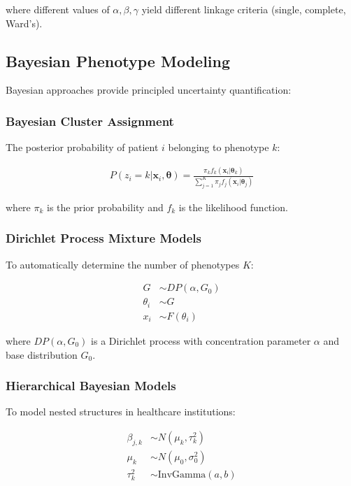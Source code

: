 \documentclass[12pt]{article}
\begin{document}
where different values of $\alpha, \beta, \gamma$ yield different linkage criteria (single, complete, Ward's).

\subsection{Bayesian Phenotype Modeling}

Bayesian approaches provide principled uncertainty quantification:

\subsubsection{Bayesian Cluster Assignment}

The posterior probability of patient $i$ belonging to phenotype $k$:

\begin{align}
P(z_i = k | \mathbf{x}_i, \boldsymbol{\theta}) = \frac{\pi_k f_k(\mathbf{x}_i | \boldsymbol{\theta}_k)}{\sum_{j=1}^K \pi_j f_j(\mathbf{x}_i | \boldsymbol{\theta}_j)}
\end{align}

where $\pi_k$ is the prior probability and $f_k$ is the likelihood function.

\subsubsection{Dirichlet Process Mixture Models}

To automatically determine the number of phenotypes $K$:

\begin{align}
G &\sim DP(\alpha, G_0)\\
\theta_i &\sim G\\
x_i &\sim F(\theta_i)
\end{align}

where $DP(\alpha, G_0)$ is a Dirichlet process with concentration parameter $\alpha$ and base distribution $G_0$.

\subsubsection{Hierarchical Bayesian Models}

To model nested structures in healthcare institutions:

\begin{align}
\beta_{j,k} &\sim N(\mu_k, \tau_k^2)\\
\mu_k &\sim N(\mu_0, \sigma_0^2)\\
\tau_k^2 &\sim \text{InvGamma}(a, b)
\end{align}
\end{document}

